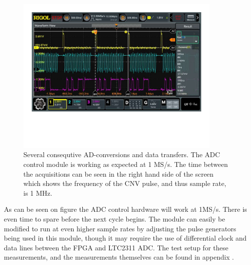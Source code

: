 \begin{figure}[H]
    \centering
    \includegraphics[clip, trim=0 150 0 0, width=0.9\textwidth]{Sections/7_SystemDesign/Figures/7_2_8_ADC_CONTROL_1MEGSAMPLE_MEAS.pdf}
    \caption{Several consequtive AD-conversions and data transfers. The ADC control module is working as expected at 1 MS/s. The time between the acquisitions can be seen in the right hand side of the screen which shows the frequency of the CNV pulse, and thus sample rate, is 1 MHz.}
    \label{fig:7_2_8_ADC_CONTROL_1MEGASAMPLE}
\end{figure}

As can be seen on figure  the ADC control hardware will work at 1MS/s. There is even time to spare before the next cycle begins. The module can easily be modified to run at even higher sample rates by adjusting the pulse generators being used in this module, though it may require the use of differential clock and data lines between the FPGA and LTC2311 ADC. The test setup for these measurements, and the measurements themselves can be found in appendix .

